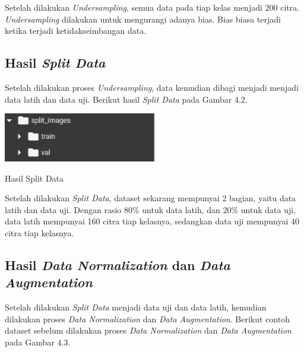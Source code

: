 Setelah dilakukan \textit{Undersampling}, semua data pada tiap kelas menjadi 200 citra. \textit{Undersampling} dilakukan untuk mengurangi adanya bias. Bias biasa terjadi ketika terjadi ketidakseimbangan data.

\subsection{Hasil \textit{Split Data}}
Setelah dilakukan proses \textit{Undersampling}, data kemudian dibagi menjadi menjadi data latih dan data uji. Berikut hasil \textit{Split Data} pada Gambar 4.2.

\begin{afigure}
    \includegraphics[width=0.5\textwidth, center]{images/hasil-split.png}
    \caption{Hasil Split Data}
    \label{fig:hasil-split}
\end{afigure}
Setelah dilakukan \textit{Split Data}, dataset sekarang mempunyai 2 bagian, yaitu data latih dan data uji. Dengan rasio 80\% untuk data latih, dan 20\% untuk data uji, data latih mempunyai 160 citra tiap kelasnya, sedangkan data uji mempunyai 40 citra tiap kelasnya.

\subsection{Hasil \textit{Data Normalization} dan \textit{Data Augmentation}}
Setelah dilakukan \textit{Split Data} menjadi data uji dan data latih, kemudian dilakukan proses \textit{Data Normalization} dan \textit{Data Augmentation}. Berikut contoh dataset sebelum dilakukan proses \textit{Data Normalization} dan \textit{Data Augmentation} pada Gambar 4.3.

